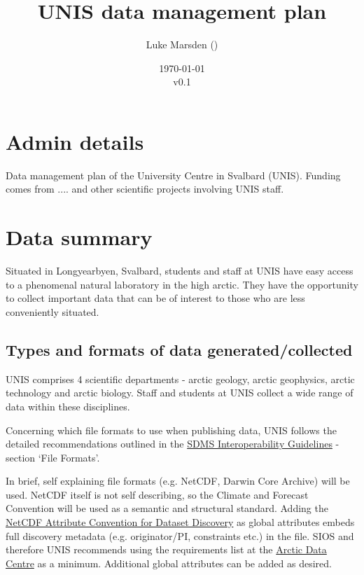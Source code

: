 \documentclass[a4paper,english, 11pt]{article}
\title{UNIS data management plan}
\date{\today\\v0.1}
\author{Luke Marsden (\emailme)}
\begin{document}
\maketitle
\tableofcontents

\newpage

\section{Admin details}
\label{s:admin}

Data management plan of the University Centre in Svalbard (UNIS). Funding comes from .... and other scientific projects involving UNIS staff.

\section{Data summary}
\label{s:data}

Situated in Longyearbyen, Svalbard, students and staff at UNIS have easy access to a phenomenal natural laboratory in the high arctic. 
They have the opportunity to collect important data that can be of interest to those who are less conveniently situated.

\subsection{Types and formats of data generated/collected}
\label{ss:datatypes}

UNIS comprises 4 scientific departments - arctic geology, arctic geophysics, arctic technology and arctic biology. Staff and students at UNIS collect a wide range of data within these disciplines.

Concerning which file formats to use when publishing data, UNIS follows the detailed recommendations outlined in the \href{https://sios-svalbard.org/sites/sios-svalbard.org/files/common/SDMS_Interoperability_Guidelines.pdf}{SDMS Interoperability Guidelines} - section `File Formats'.

In brief, self explaining file formats (e.g. NetCDF, Darwin Core Archive) will be used. NetCDF itself is not self describing, so the Climate and Forecast Convention will be used as a semantic and structural standard. Adding the \href{https://wiki.esipfed.org/Attribute_Convention_for_Data_Discovery_1-3}{NetCDF Attribute Convention for Dataset Discovery} as global attributes embeds full discovery
metadata (e.g. originator/PI, constraints etc.) in the file. SIOS and therefore UNIS recommends using the requirements list at the \href{https://adc.met.no/node/4}{Arctic Data Centre} as a minimum. Additional global attributes can be added as desired.
\end{document}
